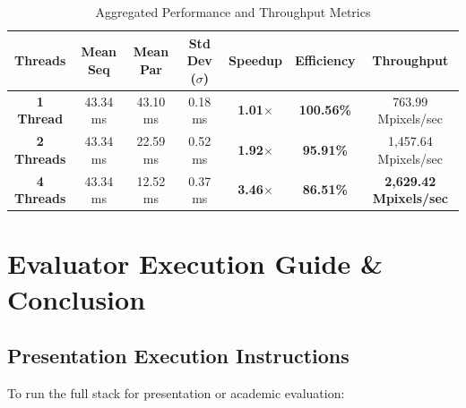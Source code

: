 \documentclass[12pt,a4paper,oneside]{report}
\begin{document}
\begin{table}[h!]
\centering
\caption{Aggregated Performance and Throughput Metrics}
\label{tab:summary_stats}
\begin{tabularx}{\textwidth}{ccccccc}
\toprule
\textbf{Threads} & \textbf{Mean Seq} & \textbf{Mean Par} & \textbf{Std Dev ($\sigma$)} & \textbf{Speedup} & \textbf{Efficiency} & \textbf{Throughput} \\
\midrule
\textbf{1 Thread} & 43.34 ms & 43.10 ms & 0.18 ms & \textbf{1.01$\times$} & \textbf{100.56\%} & 763.99 Mpixels/sec \\
\textbf{2 Threads} & 43.34 ms & 22.59 ms & 0.52 ms & \textbf{1.92$\times$} & \textbf{95.91\%} & 1,457.64 Mpixels/sec \\
\textbf{4 Threads} & 43.34 ms & 12.52 ms & 0.37 ms & \textbf{3.46$\times$} & \textbf{86.51\%} & \textbf{2,629.42 Mpixels/sec} \\
\bottomrule
\end{tabularx}
\end{table}

\chapter{Evaluator Execution Guide \& Conclusion}

\section{Presentation Execution Instructions}
To run the full stack for presentation or academic evaluation:
\end{document}
